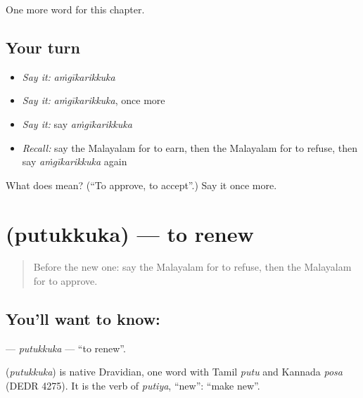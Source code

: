 \begin{grammarlens}[title={What you've built}]
One more word for this chapter.
\end{grammarlens}

\subsection*{Your turn}
\begin{itemize}
\raggedright
  \item \emph{Say it:} \emph{aṁgīkarikkuka}
  \item \emph{Say it:} \emph{aṁgīkarikkuka}, once more
  \item \emph{Say it:} say \emph{aṁgīkarikkuka}
  \item \emph{Recall:} say the Malayalam for to earn, then the Malayalam for to refuse, then say \emph{aṁgīkarikkuka} again
\end{itemize}

\begin{tcolorbox}[breakable,colback=teal!4,colframe=teal!35!black,title={Before you move on}]
What does  mean? (\textquotedblleft{}To approve, to accept\textquotedblright{}.) Say it once more.
\end{tcolorbox}
\section[\texorpdfstring{\ml{പുതുക്കുക} (putukkuka)}{പുതുക്കുക (putukkuka)}]{ (putukkuka) — to renew}

\label{lesson:ML-C268-putukkuka}



\begin{quote}
Before the new one: say the Malayalam for to refuse, then the Malayalam for to approve.
\end{quote}

\subsection*{You'll want to know: }
\textbf{} — \emph{putukkuka} — \textquotedblleft{}to renew\textquotedblright{}.

\begin{cousinweb}
\textbf{} (\emph{putukkuka}) is native Dravidian, one word with Tamil \emph{putu} and Kannada \emph{posa} (DEDR 4275). It is the verb of \emph{putiya}, \textquotedblleft{}new\textquotedblright{}: \textquotedblleft{}make new\textquotedblright{}.
\end{cousinweb}

